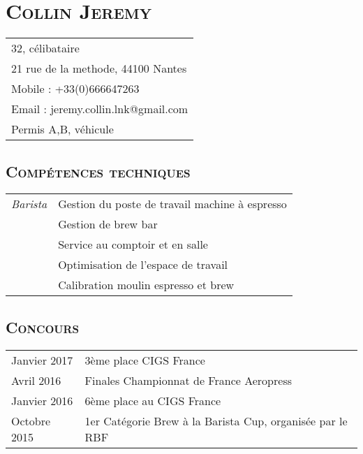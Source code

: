 \documentclass[a4paper]{article}
\newcommand{\hsection}[1]{\section*{\fontfamily{phv}\selectfont\textsc{#1}}}
\newcommand{\hsubsection}[1]{\subsection*{\fontfamily{phv}\selectfont\textsc{#1}}}
\begin{document}
\selectfont
\hsection{Collin Jeremy}
\begin{tabular}{p{16.5cm}}
\hline
32, célibataire\\
21 rue de la methode, 44100 Nantes\\
Mobile : +33(0)666647263\\
Email : jeremy.collin.lnk@gmail.com\\
Permis A,B, véhicule\\
\end{tabular}
\hsubsection{Compétences techniques}
\begin{tabular}{P{3.5cm}|p{13cm}}
\textsl{Barista} & Gestion du poste de travail machine à espresso\\
 & Gestion de brew bar\\
 & Service au comptoir et en salle\\
 & Optimisation de l’espace de travail\\
 & Calibration moulin espresso et brew\\
%
\end{tabular}

\hsubsection{Concours}
\begin{tabular}{P{3.5cm}|p{13cm}}
Janvier 2017  & 3ème place CIGS France\\
Avril 2016      & Finales Championnat de France Aeropress\\
Janvier 2016    & 6ème place au CIGS France\\
Octobre 2015    & 1er Catégorie Brew à la Barista Cup, organisée par le RBF\\
\end{tabular}
\end{document}
